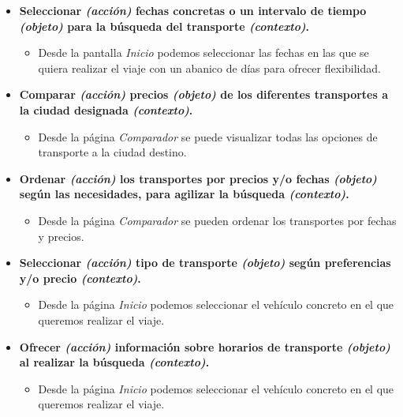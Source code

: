 \begin{itemize}
    \item \textbf{Seleccionar \textit{(acción)} fechas concretas o un intervalo de tiempo \textit{(objeto)} para la búsqueda del transporte \textit{(contexto)}.}
        \begin{itemize}
            \item Desde la pantalla \textit{Inicio} podemos seleccionar las fechas en las que se quiera realizar el viaje con un abanico de días para
                ofrecer flexibilidad.
        \end{itemize}

    \item \textbf{Comparar \textit{(acción)} precios \textit{(objeto)} de los diferentes transportes a la ciudad designada \textit{(contexto)}.}
        \begin{itemize}
            \item Desde la página \textit{Comparador} se puede visualizar todas las opciones de transporte a la ciudad destino.
        \end{itemize}

    \item \textbf{Ordenar \textit{(acción)} los transportes por precios y/o fechas \textit{(objeto)} según las necesidades, para agilizar la
        búsqueda \textit{(contexto)}.}
        \begin{itemize}
            \item Desde la página \textit{Comparador} se pueden ordenar los transportes por fechas y precios.
        \end{itemize}
    
    \item \textbf{Seleccionar \textit{(acción)} tipo de transporte \textit{(objeto)} según preferencias y/o precio \textit{(contexto)}.}
        \begin{itemize}
            \item Desde la página \textit{Inicio} podemos seleccionar el vehículo concreto en el que queremos realizar el viaje.
        \end{itemize}

    \item \textbf{Ofrecer \textit{(acción)} información sobre horarios de transporte \textit{(objeto)} al realizar la búsqueda \textit{(contexto)}.}
        \begin{itemize}
            \item Desde la página \textit{Inicio} podemos seleccionar el vehículo concreto en el que queremos realizar el viaje.
        \end{itemize}

\end{itemize}